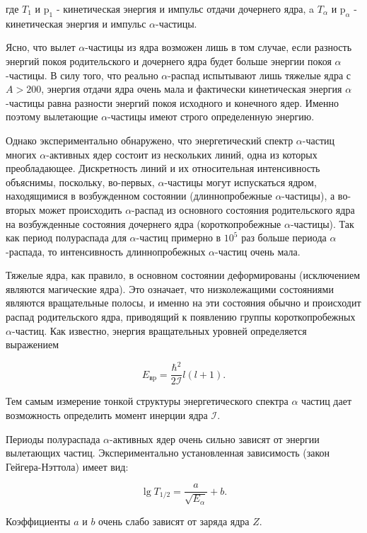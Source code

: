 \documentclass[11.5pt,a4paper,russian]{article}
\begin{document}
где $T_1$ и $\mathrm{p}_1$ - кинетическая энергия и импульс отдачи дочернего ядра, a $T_\alpha$ и $\mathrm{p}_\alpha$ - кинетическая энергия и импульс $\alpha$-частицы.

Ясно, что вылет $\alpha$-частицы из ядра возможен лишь в том случае, если разность энергий покоя родительского и дочернего ядра будет больше энергии покоя $\alpha$-частицы. В силу того, что реально $\alpha$-распад испытывают лишь тяжелые ядра с $A>200$, энергия отдачи ядра очень мала и фактически кинетическая энергия $\alpha$-частицы равна разности энергий покоя исходного и конечного ядер. Именно поэтому вылетающие $\alpha$-частицы имеют строго определенную энергию.

Однако экспериментально обнаружено, что энергетический спектр $\alpha$-частиц многих $\alpha$-активных ядер состоит из нескольких линий, одна из которых преобладающее. Дискретность линий и их относительная интенсивность объяснимы, поскольку, во-первых, $\alpha$-частицы могут испускаться ядром, находящимися в возбужденном состоянии (длиннопробежные $\alpha$-частицы), а во-вторых может происходить $\alpha$-распад из основного состояния родительского ядра на возбужденные состояния дочернего ядра (короткопробежные $\alpha$-частицы). Так как период полураспада для $\alpha$-частиц примерно в $10^5$ раз больше периода $\alpha$-распада, то интенсивность длиннопробежных $\alpha$-частиц очень мала.

Тяжелые ядра, как правило, в основном состоянии деформированы (исключением являются магические ядра). Это означает, что низколежащими состояниями являются вращательные полосы, и именно на эти состояния обычно и происходит распад родительского ядра, приводящий к появлению группы короткопробежных $\alpha$-частиц. Как известно, энергия вращательных уровней определяется выражением

$$
E_\text{вp}=\frac{\hbar^2}{2 \mathcal{I}} l(l+1).
$$

Тем самым измерение тонкой структуры энергетического спектра $\alpha$ частиц дает возможность определить момент инерции ядра $\mathcal{I}$.

Периоды полураспада $\alpha$-активных ядер очень сильно зависят от энергии вылетающих частиц. Экспериментально установленная зависимость (закон Гейгера-Нэттола) имеет вид:

\begin{equation}\label{eq:gey_net}
\lg T_{1 / 2}=\frac{a}{\sqrt{E_\alpha}}+b .
\end{equation}

Коэффициенты $a$ и $b$ очень слабо зависят от заряда ядра $Z$.
\end{document}
